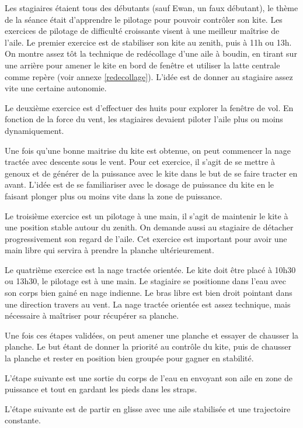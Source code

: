 \documentclass[11pt,a4paper]{report}
\begin{document}
Les stagiaires étaient tous des débutants (sauf Ewan, un faux débutant), 
le thème de la séance était d'apprendre le pilotage pour pouvoir contrôler son kite.
Les exercices de pilotage de difficulté croissante visent à une
meilleur maîtrise de l'aile.
Le premier exercice est de stabiliser son kite au zenith, puis à 11h ou 13h.
On montre assez t\^ot la technique de redécollage d'une aile à 
boudin, en tirant sur une arrière pour amener le kite en bord
de fen\^etre et utiliser la latte centrale comme repère (voir annexe \ref{redecollage}).  L'idée est de donner au stagiaire assez vite une certaine
autonomie.
 
Le deuxième exercice est d'effectuer des huits pour explorer la 
fen\^etre de vol.
En fonction de la force du vent, les stagiaires
devaient piloter l'aile plus ou moins dynamiquement. 

Une fois qu'une bonne maitrise du kite est obtenue, 
on peut commencer la  nage tractée avec descente sous 
le vent. Pour cet exercice, il s'agit de se mettre à genoux
et de générer de la puissance avec le kite dans le but
de se faire tracter en avant.  L'idée est de se familiariser
avec le dosage de puissance du kite en le faisant plonger
plus ou moins vite dans la zone de puissance.

Le troisième exercice est un pilotage à une main, il s'agit
de maintenir le kite à une position stable autour
du zenith. On demande aussi au stagiaire de
détacher progressivement son regard de l'aile.
Cet exercice est important pour avoir une main libre
qui servira à prendre la planche ultérieurement.

Le quatrième exercice est la nage tractée orientée.
Le kite doit être placé à 10h30 ou 13h30, le pilotage
est à une main. Le stagiaire se positionne dans l'eau
avec son corps bien gainé en nage indienne. Le bras
libre est bien droit pointant dans une direction 
travers au vent. La nage tractée orientée est assez
technique, mais nécessaire à maîtriser pour récupérer 
sa planche.

Une fois ces étapes validées, on peut
amener une planche et essayer de chausser la planche.
Le but étant de donner la priorité au contrôle du kite, 
puis de chausser la planche et rester en position bien 
groupée pour gagner en stabilité.


L'étape suivante est une sortie du corps de l'eau
en envoyant son aile en zone de puissance et tout en 
gardant les pieds dans les straps. 

L'étape suivante est de partir en glisse avec
une aile stabilisée et une trajectoire constante.
\end{document}
